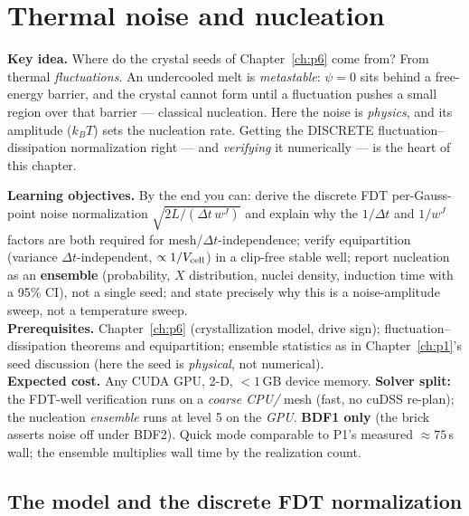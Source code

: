 \chapter{Thermal noise and nucleation}
\label{ch:p8}

\begin{keybox}
\textbf{Key idea.} Where do the crystal seeds of Chapter~\ref{ch:p6} come
from? From thermal \emph{fluctuations}. An undercooled melt is
\emph{metastable}: $\psi=0$ sits behind a free-energy barrier, and the
crystal cannot form until a fluctuation pushes a small region over that
barrier --- classical nucleation. Here the noise is \emph{physics}, and
its amplitude ($k_BT$) sets the nucleation rate. Getting the DISCRETE
fluctuation--dissipation normalization right --- and \emph{verifying} it
numerically --- is the heart of this chapter.
\end{keybox}

\begin{keybox}
\textbf{Learning objectives.} By the end you can: derive the discrete FDT
per-Gauss-point noise normalization $\sqrt{2L/(\Delta t\,w^J)}$ and explain
why the $1/\Delta t$ and $1/w^J$ factors are both required for
mesh/$\Delta t$-independence; verify equipartition (variance
$\Delta t$-independent, $\propto1/V_{\rm cell}$) in a clip-free stable
well; report nucleation as an \textbf{ensemble} (probability, $X$
distribution, nuclei density, induction time with a 95\% CI), not a
single seed; and state precisely why this is a noise-amplitude sweep, not
a temperature sweep.\\[2pt]
\textbf{Prerequisites.} Chapter~\ref{ch:p6} (crystallization model, drive
sign); fluctuation--dissipation theorems and equipartition; ensemble
statistics as in Chapter~\ref{ch:p1}'s seed discussion (here the seed is
\emph{physical}, not numerical).\\[2pt]
\textbf{Expected cost.} Any CUDA GPU, 2-D, $<1$\,GB device memory.
\textbf{Solver split:} the FDT-well verification runs on a
\emph{coarse CPU/} mesh (fast, no cuDSS re-plan); the
nucleation \emph{ensemble} runs at level 5 on the \emph{GPU}.
\textbf{BDF1 only} (the brick asserts noise off under BDF2). Quick mode
comparable to P1's measured $\approx75$\,s wall; the ensemble multiplies
wall time by the realization count.
\end{keybox}

\section{The model and the discrete FDT normalization}

